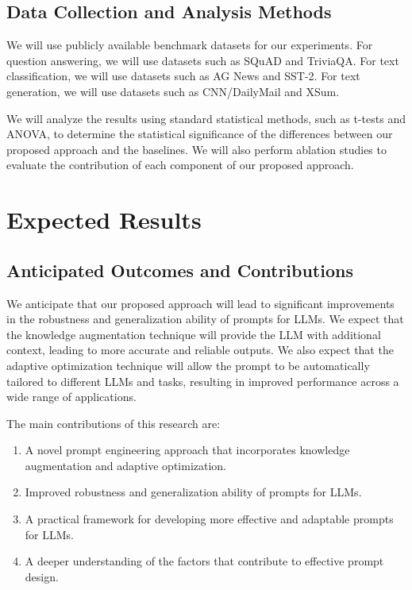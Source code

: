 \documentclass{article}
\begin{document}
\subsection{Data Collection and Analysis Methods}

We will use publicly available benchmark datasets for our experiments. For question answering, we will use datasets such as SQuAD and TriviaQA. For text classification, we will use datasets such as AG News and SST-2. For text generation, we will use datasets such as CNN/DailyMail and XSum.

We will analyze the results using standard statistical methods, such as t-tests and ANOVA, to determine the statistical significance of the differences between our proposed approach and the baselines. We will also perform ablation studies to evaluate the contribution of each component of our proposed approach.

\section{Expected Results}

\subsection{Anticipated Outcomes and Contributions}

We anticipate that our proposed approach will lead to significant improvements in the robustness and generalization ability of prompts for LLMs. We expect that the knowledge augmentation technique will provide the LLM with additional context, leading to more accurate and reliable outputs. We also expect that the adaptive optimization technique will allow the prompt to be automatically tailored to different LLMs and tasks, resulting in improved performance across a wide range of applications.

The main contributions of this research are:

\begin{enumerate}
    \item A novel prompt engineering approach that incorporates knowledge augmentation and adaptive optimization.
    \item Improved robustness and generalization ability of prompts for LLMs.
    \item A practical framework for developing more effective and adaptable prompts for LLMs.
    \item A deeper understanding of the factors that contribute to effective prompt design.
\end{enumerate}
\end{document}

